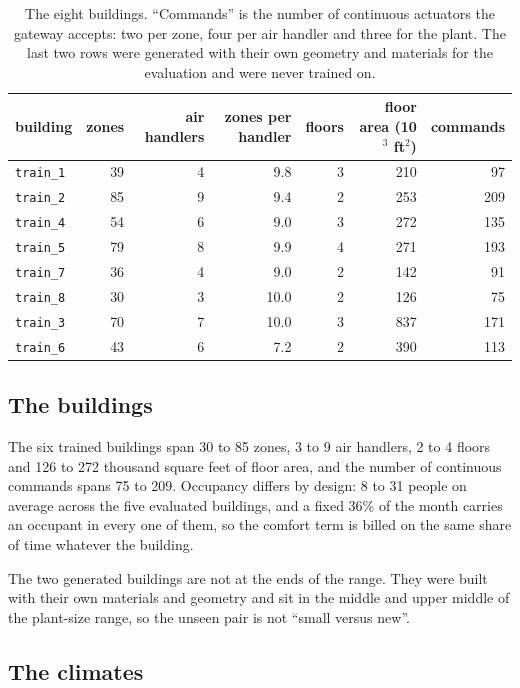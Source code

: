 \documentclass{article}
\begin{document}
\begin{table}[h!]
\centering
\small
\begin{tabular}{@{}lrrrrrr@{}}
\toprule
building & zones & air handlers & zones per handler & floors & floor area (10$^3$ ft$^2$) & commands \\
\midrule
\texttt{train\_1} & 39 & 4 & 9.8 & 3 & 210 & 97 \\
\texttt{train\_2} & 85 & 9 & 9.4 & 2 & 253 & 209 \\
\texttt{train\_4} & 54 & 6 & 9.0 & 3 & 272 & 135 \\
\texttt{train\_5} & 79 & 8 & 9.9 & 4 & 271 & 193 \\
\texttt{train\_7} & 36 & 4 & 9.0 & 2 & 142 & 91 \\
\texttt{train\_8} & 30 & 3 & 10.0 & 2 & 126 & 75 \\
\midrule
\texttt{train\_3} & 70 & 7 & 10.0 & 3 & 837 & 171 \\
\texttt{train\_6} & 43 & 6 & 7.2 & 2 & 390 & 113 \\
\bottomrule
\end{tabular}
\vspace{4pt}
\caption{The eight buildings. ``Commands'' is the number of continuous actuators the gateway accepts: two per zone, four per air handler and three for the plant. The last two rows were generated with their own geometry and materials for the evaluation and were never trained on.}
\label{tab:app_buildings}
\end{table}

\subsection{The buildings}
\label{app:building_text}

The six trained buildings span 30 to 85 zones, 3 to 9 air handlers, 2 to 4 floors and 126 to 272 thousand square feet of floor area, and the number of continuous commands spans 75 to 209. Occupancy differs by design: 8 to 31 people on average across the five evaluated buildings, and a fixed 36\% of the month carries an occupant in every one of them, so the comfort term is billed on the same share of time whatever the building.

The two generated buildings are not at the ends of the range. They were built with their own materials and geometry and sit in the middle and upper middle of the plant-size range, so the unseen pair is not ``small versus new''.

\subsection{The climates}
\label{app:climates}
\end{document}
